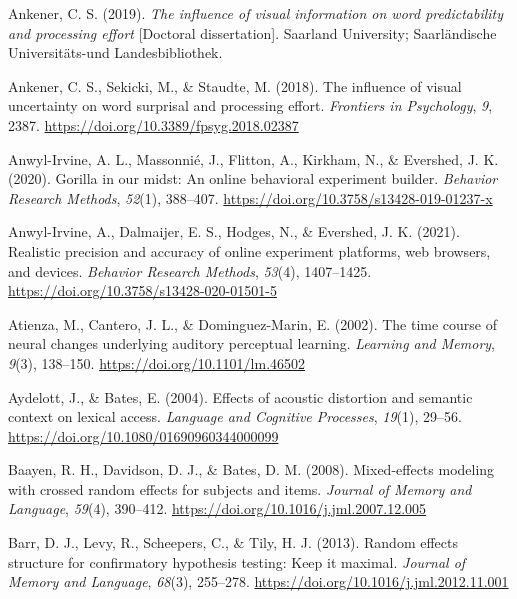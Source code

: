 \documentclass[a4paper, nobind]{templates/ociamthesis}
\newlength{\cslhangindent}
\newenvironment{CSLReferences}[2] %
 {%
  \setlength{\parindent}{0pt}
  \ifodd #1
  \let\oldpar\par
  \def\par{\hangindent=\cslhangindent\oldpar}
  \fi
  \setlength{\parskip}{1mm}
  \setlength{\baselineskip}{6mm}
 }%
 {}
\begin{document}
\begin{CSLReferences}{1}{0}
\leavevmode{}%
Ankener, C. S. (2019). \emph{{The influence of visual information on word predictability and processing effort}} {[}Doctoral dissertation{]}. Saarland University; Saarl{ä}ndische Universit{ä}ts-und Landesbibliothek.

\leavevmode{}%
Ankener, C. S., Sekicki, M., \& Staudte, M. (2018). {The influence of visual uncertainty on word surprisal and processing effort}. \emph{Frontiers in Psychology}, \emph{9}, 2387. \url{https://doi.org/10.3389/fpsyg.2018.02387}

\leavevmode{}%
Anwyl-Irvine, A. L., Massonnié, J., Flitton, A., Kirkham, N., \& Evershed, J. K. (2020). {Gorilla in our midst: An online behavioral experiment builder}. \emph{Behavior Research Methods}, \emph{52}(1), 388--407. \url{https://doi.org/10.3758/s13428-019-01237-x}

\leavevmode{}%
Anwyl-Irvine, A., Dalmaijer, E. S., Hodges, N., \& Evershed, J. K. (2021). {Realistic precision and accuracy of online experiment platforms, web browsers, and devices}. \emph{Behavior Research Methods}, \emph{53}(4), 1407--1425. \url{https://doi.org/10.3758/s13428-020-01501-5}

\leavevmode{}%
Atienza, M., Cantero, J. L., \& Dominguez-Marin, E. (2002). {The time course of neural changes underlying auditory perceptual learning}. \emph{Learning and Memory}, \emph{9}(3), 138--150. \url{https://doi.org/10.1101/lm.46502}

\leavevmode{}%
Aydelott, J., \& Bates, E. (2004). {Effects of acoustic distortion and semantic context on lexical access}. \emph{Language and Cognitive Processes}, \emph{19}(1), 29--56. \url{https://doi.org/10.1080/01690960344000099}

\leavevmode{}%
Baayen, R. H., Davidson, D. J., \& Bates, D. M. (2008). {Mixed-effects modeling with crossed random effects for subjects and items}. \emph{Journal of Memory and Language}, \emph{59}(4), 390--412. \url{https://doi.org/10.1016/j.jml.2007.12.005}

\leavevmode{}%
Barr, D. J., Levy, R., Scheepers, C., \& Tily, H. J. (2013). Random effects structure for confirmatory hypothesis testing: Keep it maximal. \emph{Journal of Memory and Language}, \emph{68}(3), 255--278. \url{https://doi.org/10.1016/j.jml.2012.11.001}


\end{CSLReferences}
\end{document}
